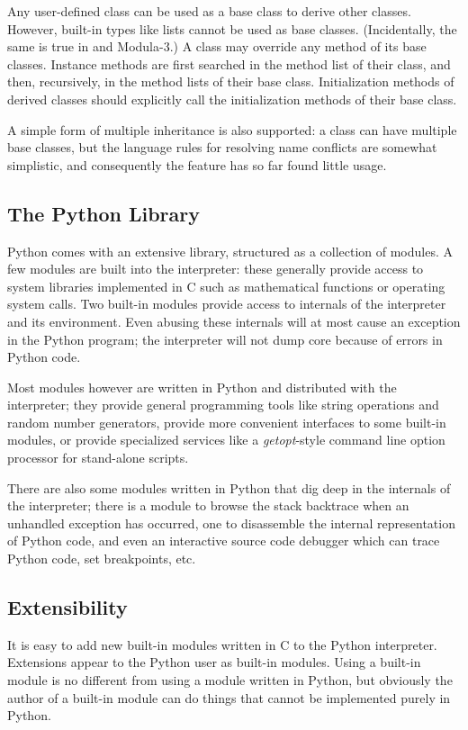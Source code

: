 Any user-defined class can be used as a base class to derive other
classes.  However, built-in types like lists cannot be used as base
classes.  (Incidentally, the same is true in \Cpp{} and Modula-3.)  A
class may override any method of its base classes.  Instance methods
are first searched in the method list of their class, and then,
recursively, in the method lists of their base class.  Initialization
methods of derived classes should explicitly call the initialization
methods of their base class.

A simple form of multiple inheritance is also supported: a class can
have multiple base classes, but the language rules for resolving name
conflicts are somewhat simplistic, and consequently the feature has so
far found little usage.

\subsection{The Python Library}

Python comes with an extensive library, structured as a collection of
modules.  A few modules are built into the interpreter: these
generally provide access to system libraries implemented in C such as
mathematical functions or operating system calls.  Two built-in
modules provide access to internals of the interpreter and its
environment.  Even abusing these internals will at most cause an
exception in the Python program; the interpreter will not dump core
because of errors in Python code.

Most modules however are written in Python and distributed with the
interpreter; they provide general programming tools like string
operations and random number generators, provide more convenient
interfaces to some built-in modules, or provide specialized services
like a {\em getopt}-style command line option processor for
stand-alone scripts.

There are also some modules written in Python that dig deep in the
internals of the interpreter; there is a module to browse the stack
backtrace when an unhandled exception has occurred, one to disassemble
the internal representation of Python code, and even an interactive
source code debugger which can trace Python code, set breakpoints,
etc.

\subsection{Extensibility}

It is easy to add new built-in modules written in C to the Python
interpreter.  Extensions appear to the Python user as built-in
modules.  Using a built-in module is no different from using a module
written in Python, but obviously the author of a built-in module can
do things that cannot be implemented purely in Python.

